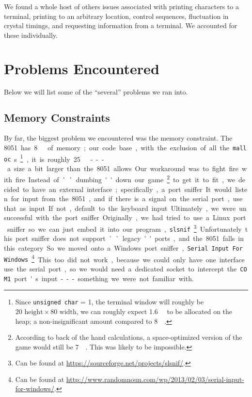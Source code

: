 \documentclass[12pt]{article}
\newcommand{\shellcmd}[1]{\texttt{\colorbox{gray!30}{#1}}}
\begin{document}
We found a whole host of others issues associated with printing characters to a terminal, printing to an arbitrary location, control sequences, fluctuation in crystal timings, and requesting information from a terminal. We accounted for these individually.

\section{Problems Encountered}
Below we will list some of the ``several'' problems we ran into.

\subsection{Memory Constraints}
By far, the biggest problem we encountered was the memory constraint. The \SI{8051} has \SI{8}{\kilo\byte} of memory; our code base, with the exclusion of all the \shellcmd{malloc}s\footnote{Since \shellcmd{unsigned char} = \SI{1}{\byte}, the terminal window will roughly be $20\text{ height} \times 80\text{ width} $, we can roughly expect \SI{1.6}{\kilo\byte} to be allocated on the heap; a non-insignificant amount compared to \SI{8}{\kilo\byte}.}, it is roughly \SI{25}{\kilo\byte} --- a size a bit larger than the \num{8051} allows. Our workaround was to fight fire with fire.

Instead of ``dumbing'' down our game\footnote{According to back of the hand calculations, a space-optimized version of the game would still be \SI{7}{\kilo\byte}. This was likely to be impossible.} to get it to fit, we decided to have an external interface; specifically, a port sniffer. It would listen for input from the \num{8051}, and if there is a signal on the serial port, use that as input. If not, default to the keyboard input.

Ultimately, we were unsuccessful with the port sniffer. Originally, we had tried to use a Linux port sniffer so we can just embed it into our program, \shellcmd{slsnif}\footnote{Can be found at \url{https://sourceforge.net/projects/slsnif/}.}. Unfortunately this port sniffer does not support ``legacy'' ports, and the \num{8051} falls in this category. So we moved onto a Windows port sniffer, \shellcmd{Serial Input For Windows}\footnote{Can be found at \url{http://www.randomnoun.com/wp/2013/02/03/serial-input-for-windows/}.}. This too did not work, because we could only have one interface use the serial port, so we would need a dedicated socket to intercept the \shellcmd{COM1} port's input --- something we were not familiar with.
\end{document}
